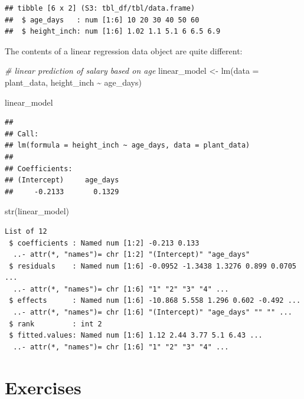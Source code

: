 \documentclass[
]{book}
\newenvironment{Shaded}{\begin{snugshade}}{\end{snugshade}}
\newcommand{\AttributeTok}[1]{\textcolor[rgb]{0.77,0.63,0.00}{#1}}
\newcommand{\CommentTok}[1]{\textcolor[rgb]{0.56,0.35,0.01}{\textit{#1}}}
\newcommand{\FunctionTok}[1]{\textcolor[rgb]{0.00,0.00,0.00}{#1}}
\newcommand{\NormalTok}[1]{#1}
\newcommand{\OtherTok}[1]{\textcolor[rgb]{0.56,0.35,0.01}{#1}}
\newcommand{\SpecialCharTok}[1]{\textcolor[rgb]{0.00,0.00,0.00}{#1}}
\begin{document}
\begin{verbatim}
## tibble [6 x 2] (S3: tbl_df/tbl/data.frame)
##  $ age_days   : num [1:6] 10 20 30 40 50 60
##  $ height_inch: num [1:6] 1.02 1.1 5.1 6 6.5 6.9
\end{verbatim}

The contents of a linear regression data object are quite different:

\begin{Shaded}
\begin{Highlighting}[]
\CommentTok{\# linear prediction of salary based on age}
\NormalTok{linear\_model }\OtherTok{\textless{}{-}} \FunctionTok{lm}\NormalTok{(}\AttributeTok{data =}\NormalTok{ plant\_data, height\_inch }\SpecialCharTok{\textasciitilde{}}\NormalTok{ age\_days)}

\NormalTok{linear\_model}
\end{Highlighting}
\end{Shaded}

\begin{verbatim}
## 
## Call:
## lm(formula = height_inch ~ age_days, data = plant_data)
## 
## Coefficients:
## (Intercept)     age_days  
##     -0.2133       0.1329
\end{verbatim}

\begin{Shaded}
\begin{Highlighting}[]
\FunctionTok{str}\NormalTok{(linear\_model)}
\end{Highlighting}
\end{Shaded}

\begin{verbatim}
List of 12
 $ coefficients : Named num [1:2] -0.213 0.133
  ..- attr(*, "names")= chr [1:2] "(Intercept)" "age_days"
 $ residuals    : Named num [1:6] -0.0952 -1.3438 1.3276 0.899 0.0705 ...
  ..- attr(*, "names")= chr [1:6] "1" "2" "3" "4" ...
 $ effects      : Named num [1:6] -10.868 5.558 1.296 0.602 -0.492 ...
  ..- attr(*, "names")= chr [1:6] "(Intercept)" "age_days" "" "" ...
 $ rank         : int 2
 $ fitted.values: Named num [1:6] 1.12 2.44 3.77 5.1 6.43 ...
  ..- attr(*, "names")= chr [1:6] "1" "2" "3" "4" ...
\end{verbatim}

\hypertarget{exercises-1}{%
\section*{Exercises}\label{exercises-1}}
\end{document}
